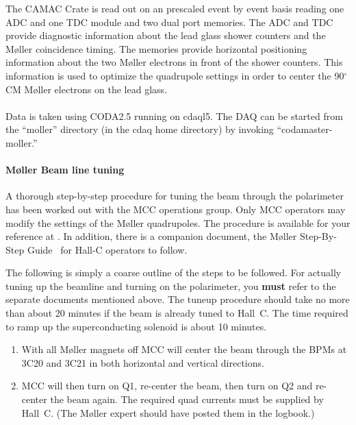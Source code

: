 {The CAMAC Crate is read out on an prescaled event by event basis
reading one ADC and one TDC module and two dual port memories. The ADC
and TDC provide diagnostic information about the lead glass shower
counters and the M\o ller coincidence timing. The memories provide
horizontal positioning information about the two M\o ller electrons in
front of the shower counters. This information is used to optimize the
quadrupole settings in order to center the 90$^{\circ}$ CM M\o ller
electrons on the lead glass. \\ \\ Data is taken using CODA2.5 running
on cdaql5. The DAQ can be started from the ``moller'' directory (in
the cdaq home directory) by invoking ``codamaster-moller.''

\paragraph{M\o ller Beam line tuning}

A thorough step-by-step procedure for tuning the beam through the
polarimeter has been worked out with the MCC operations group. Only
MCC operators may modify the settings of the M\o ller quadrupoles.
The procedure is available for your reference at
. In addition, there is a companion 
document, the M\o ller Step-By-Step Guide~\cite{howto:moller_sbys}
for Hall-C operators to follow.

The following is simply a coarse outline of the steps to be followed.
For actually tuning up the beamline and turning on the polarimeter,
you {\bf must} refer to the separate documents mentioned above. The
tuneup procedure should take no more than about 20 minutes if the beam
is already tuned to Hall~C.  The time required to ramp up the
superconducting solenoid is about 10 minutes.
\begin{enumerate}
        \item With all M\o ller magnets off MCC will
           center  the beam through the BPMs at 3C20 and 3C21  in both
           horizontal  and vertical  directions. 

        \item MCC will then turn on Q1, re-center the beam, then turn
	on Q2 and re-center the beam again. The required quad currents
	must be supplied by Hall~C.  (The M\o ller expert should have
	posted them in the logbook.)


\end{enumerate}}
